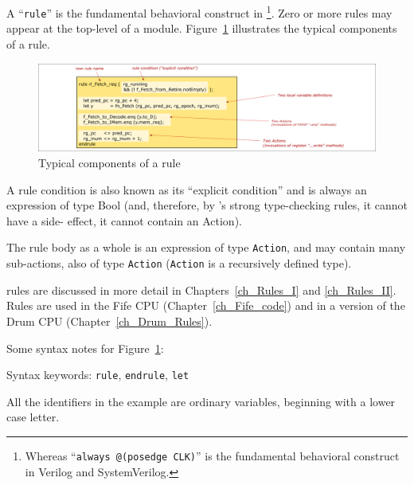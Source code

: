 
A ``\verb|rule|'' is the fundamental behavioral construct in
{\BSV}\footnote{Whereas ``{\tt always @(posedge CLK)}'' is the
fundamental behavioral construct in Verilog and SystemVerilog.}. Zero
or more rules may appear at the top-level of a {\BSV} module.
Figure~\ref{Fig_BSV_whats_in_a_rule} illustrates the typical
components of a rule.

\begin{figure}[htbp]
  \centerline{\includegraphics[width=6in,angle=0]{Figures/Fig_BSV_whats_in_a_rule}}
  \caption{\label{Fig_BSV_whats_in_a_rule}
           Typical components of a rule}
\end{figure}

A rule condition is also known as its ``explicit condition'' and is
always an expression of type Bool (and, therefore, by {\BSV}'s strong
type-checking rules, it cannot have a side- effect, {\ie} it cannot
contain an Action).

The rule body as a whole is an expression of type \verb|Action|, and
may contain many sub-actions, also of type \verb|Action|
(\verb|Action| is a recursively defined type).

{\BSV} rules are discussed in more detail in Chapters~\ref{ch_Rules_I}
and \ref{ch_Rules_II}.  Rules are used in the Fife CPU
(Chapter~\ref{ch_Fife_code}) and in a version of the Drum CPU
(Chapter~\ref{ch_Drum_Rules}).

Some syntax notes for Figure~\ref{Fig_BSV_whats_in_a_rule}:

\begin{tightlist}

 \item Syntax keywords: \verb|rule|, \verb|endrule|, \verb|let|

 \item All the identifiers in the example are ordinary variables,
       beginning with a lower case letter.

\end{tightlist}


